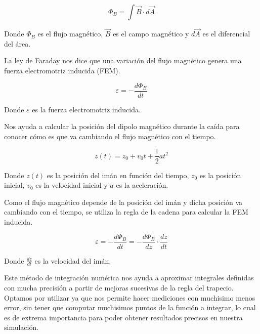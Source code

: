 \begin{equation}
    \Phi_B = \int \vec{B} \cdot d\vec{A}
\end{equation}

Donde $\Phi_B$ es el flujo magnético, $\vec{B}$ es el campo magnético y $d\vec{A}$ es el diferencial del área.



\tab La ley de Faraday nos dice que una variación del flujo magnético genera una fuerza electromotriz inducida (FEM).

\begin{equation}
    \varepsilon = -\frac{d\Phi_B}{dt}
\end{equation}

Donde $\varepsilon$ es la fuerza electromotriz inducida.


\tab Nos ayuda a calcular la posición del dipolo magnético durante la caída para conocer cómo es que va cambiando el flujo magnético con el tiempo.

\begin{equation}
    z(t) = z_0 + v_0 t + \frac{1}{2} a t^2
\end{equation}

Donde $z(t)$ es la posición del imán en función del tiempo, $z_0$ es la posición inicial, $v_0$ es la velocidad inicial y $a$ es la aceleración.


\tab Como el flujo magnético depende de la posición del imán y dicha posición va cambiando con el tiempo, se utiliza la regla de la cadena para calcular la FEM inducida.

\begin{equation}
    \varepsilon = -\frac{d\Phi_B}{dt} = -\frac{d\Phi_B}{dz} \cdot \frac{dz}{dt}
\end{equation}

Donde $\frac{dz}{dt}$ es la velocidad del imán.


\tab Este método de integración numérica nos ayuda a aproximar integrales definidas con mucha precisión a partir de mejoras sucesivas de la regla del trapecio. Optamos por utilizar ya que nos permite hacer mediciones con muchisimo menos error, sin tener que computar muchisimos puntos de la función a integrar, lo cual es de extrema importancia para poder obtener resultados precisos en nuestra simulación.

